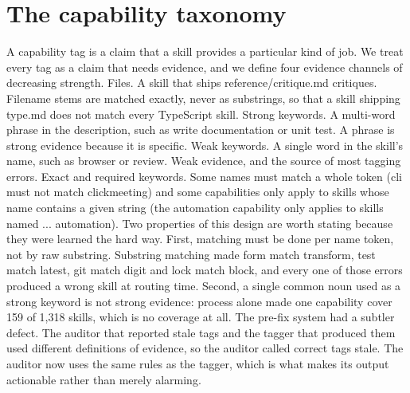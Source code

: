 \documentclass[sigconf,acmsmall]{acmart}
\begin{document}
\section{The capability taxonomy}
A capability tag is a claim that a skill provides a particular kind of job. We treat every tag as a claim that needs evidence, and we define four evidence channels of decreasing strength.
Files. A skill that ships reference/critique.md critiques. Filename stems are matched exactly, never as substrings, so that a skill shipping type.md does not match every TypeScript skill.
Strong keywords. A multi-word phrase in the description, such as write documentation or unit test. A phrase is strong evidence because it is specific.
Weak keywords. A single word in the skill's name, such as browser or review. Weak evidence, and the source of most tagging errors.
Exact and required keywords. Some names must match a whole token (cli must not match clickmeeting) and some capabilities only apply to skills whose name contains a given string (the automation capability only applies to skills named ... automation).
Two properties of this design are worth stating because they were learned the hard way. First, matching must be done per name token, not by raw substring. Substring matching made form match transform, test match latest, git match digit and lock match block, and every one of those errors produced a wrong skill at routing time. Second, a single common noun used as a strong keyword is not strong evidence: process alone made one capability cover 159 of 1,318 skills, which is no coverage at all.
The pre-fix system had a subtler defect. The auditor that reported stale tags and the tagger that produced them used different definitions of evidence, so the auditor called correct tags stale. The auditor now uses the same rules as the tagger, which is what makes its output actionable rather than merely alarming.
\end{document}
